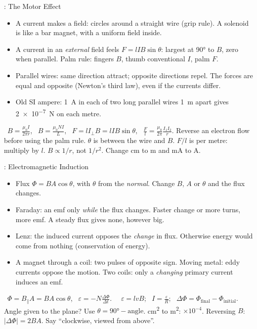 \begin{summarybox}[fontupper=\small]{: The Motor Effect}
\begin{itemize}[itemsep=0pt, topsep=0pt]
  \item A current makes a field: circles around a straight wire (grip rule). A solenoid is
        like a bar magnet, with a uniform field inside.
  \item A current in an \emph{external} field feels $F = lIB\sin\theta$: largest at \ang{90}
        to $B$, zero when parallel. Palm rule: fingers $B$, thumb conventional $I$, palm $F$.
  \item Parallel wires: same direction attract; opposite directions repel. The forces are
        equal and opposite (Newton's third law), even if the currents differ.
  \item Old SI ampere: \qty{1}{A} in each of two long parallel wires \qty{1}{m} apart gives
        \qty{2e-7}{N} on each metre.
\end{itemize}
 \sumSheet\ $B = \frac{\mu_0 I}{2\pi r}$, \ $B = \frac{\mu_0 NI}{L}$, \
$F = lI_\perp B = lIB\sin\theta$, \ $\frac{F}{l} = \frac{\mu_0}{2\pi}\frac{I_1 I_2}{r}$.
\sumhead{Traps} Reverse an electron flow before using the palm rule. $\theta$ is between the
wire and $B$. $F/l$ is per metre: multiply by $l$. $B \propto 1/r$, not $1/r^2$. Change cm
to m and mA to A.
\end{summarybox}

\begin{summarybox}[fontupper=\small]{: Electromagnetic Induction}
\begin{itemize}[itemsep=0pt, topsep=0pt]
  \item Flux $\Phi = BA\cos\theta$, with $\theta$ from the \emph{normal}. Change $B$, $A$ or
        $\theta$ and the flux changes.
  \item Faraday: an emf only \emph{while} the flux changes. Faster change or more turns, more
        emf. A steady flux gives none, however big.
  \item Lenz: the induced current opposes the \emph{change} in flux. Otherwise energy would
        come from nothing (conservation of energy).
  \item A magnet through a coil: two pulses of opposite sign. Moving metal: eddy currents
        oppose the motion. Two coils: only a \emph{changing} primary current induces an emf.
\end{itemize}
 \sumSheet\ $\Phi = B_\parallel A = BA\cos\theta$, \
$\varepsilon = -N\frac{\Delta\Phi}{\Delta t}$. \ \sumLearn\ $\varepsilon = lvB$; \
$I = \frac{\varepsilon}{R}$; \ $\Delta\Phi = \Phi_\mathrm{final} - \Phi_\mathrm{initial}$.
\sumhead{Traps} Angle given to the plane? Use $\theta = \ang{90} - \text{angle}$. \si{cm^2}
to \si{m^2}: $\times 10^{-4}$. Reversing $B$: $\lvert\Delta\Phi\rvert = 2BA$. Say ``clockwise, viewed from
above''.
\end{summarybox}

